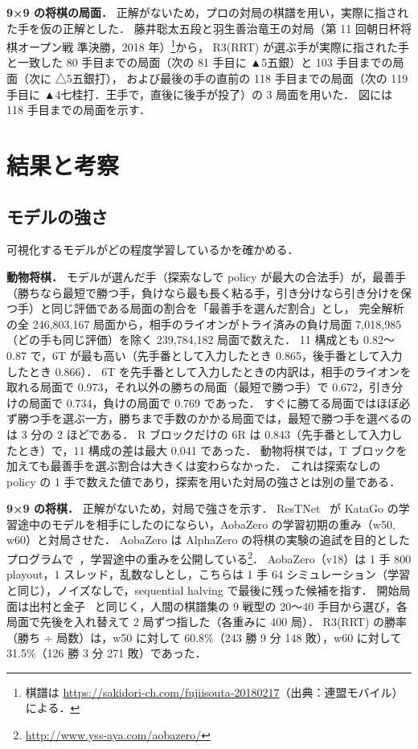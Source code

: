\documentclass[submit]{ipsj}
\begin{document}
\textbf{9×9 の将棋の局面．}
正解がないため，プロの対局の棋譜を用い，実際に指された手を仮の正解とした．
藤井聡太五段と羽生善治竜王の対局（第 11 回朝日杯将棋オープン戦 準決勝，2018 年）\footnote{棋譜は \url{https://sakidori-ch.com/fujiisouta-20180217}（出典：連盟モバイル）による．}から，
R3(RRT) が選ぶ手が実際に指された手と一致した 80 手目までの局面（次の 81 手目に ▲5五銀）と 103 手目までの局面（次に △5五銀打），
および最後の手の直前の 118 手目までの局面（次の 119 手目に ▲4七桂打．王手で，直後に後手が投了）の 3 局面を用いた．
図には 118 手目までの局面を示す．

\section{結果と考察}
\subsection{モデルの強さ}
\label{sec:reliability}
可視化するモデルがどの程度学習しているかを確かめる．

\textbf{動物将棋．}
モデルが選んだ手（探索なしで policy が最大の合法手）が，最善手（勝ちなら最短で勝つ手，負けなら最も長く粘る手，引き分けなら引き分けを保つ手）と同じ評価である局面の割合を「最善手を選んだ割合」とし，
完全解析の全 246,803,167 局面から，相手のライオンがトライ済みの負け局面 7,018,985（どの手も同じ評価）を除く 239,784,182 局面で数えた．
11 構成とも 0.82〜0.87 で，6T が最も高い（先手番として入力したとき 0.865，後手番として入力したとき 0.866）．
6T を先手番として入力したときの内訳は，相手のライオンを取れる局面で 0.973，それ以外の勝ちの局面（最短で勝つ手）で 0.672，引き分けの局面で 0.734，負けの局面で 0.769 であった．
すぐに勝てる局面ではほぼ必ず勝つ手を選ぶ一方，勝ちまで手数のかかる局面では，最短で勝つ手を選べるのは 3 分の 2 ほどである．
R ブロックだけの 6R は 0.843（先手番として入力したとき）で，11 構成の差は最大 0.041 であった．
動物将棋では，T ブロックを加えても最善手を選ぶ割合は大きくは変わらなかった．
これは探索なしの policy の 1 手で数えた値であり，探索を用いた対局の強さとは別の量である．

\textbf{9×9 の将棋．}
正解がないため，対局で強さを示す．
ResTNet~\cite{restnet} が KataGo の学習途中のモデルを相手にしたのにならい，AobaZero の学習初期の重み（w50, w60）と対局させた．
AobaZero は AlphaZero の将棋の実験の追試を目的としたプログラムで~\cite{aoba2020,aoba2021}，学習途中の重みを公開している\footnote{\url{http://www.yss-aya.com/aobazero/}}．
AobaZero（v18）は 1 手 800 playout，1 スレッド，乱数なしとし，こちらは 1 手 64 シミュレーション（学習と同じ），ノイズなしで，sequential halving で最後に残った候補を指す．
開始局面は出村と金子~\cite{demura2023} と同じく，人間の棋譜集の 9 戦型の 20〜40 手目から選び，各局面で先後を入れ替えて 2 局ずつ指した（各重みに 400 局）．
R3(RRT) の勝率（勝ち ÷ 局数）は，w50 に対して 60.8\%（243 勝 9 分 148 敗），w60 に対して 31.5\%（126 勝 3 分 271 敗）であった．
\end{document}
